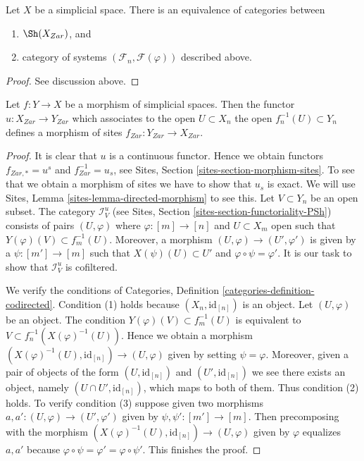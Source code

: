 \begin{lemma}
\label{lemma-describe-sheaves-simplicial-site}
Let $X$ be a simplicial space. There is an equivalence of
categories between
\begin{enumerate}
\item $\Sh(X_{Zar})$, and
\item category of systems $(\mathcal{F}_n, \mathcal{F}(\varphi))$
described above.
\end{enumerate}
\end{lemma}

\begin{proof}
See discussion above.
\end{proof}

\begin{lemma}
\label{lemma-simplicial-space-site-functorial}
Let $f : Y \to X$ be a morphism of simplicial spaces.
Then the functor $u : X_{Zar} \to Y_{Zar}$
which associates to the open $U \subset X_n$ the open
$f_n^{-1}(U) \subset Y_n$ defines a morphism of sites
$f_{Zar} : Y_{Zar} \to X_{Zar}$.
\end{lemma}

\begin{proof}
It is clear that $u$ is a continuous functor. Hence we obtain functors
$f_{Zar, *} = u^s$ and $f_{Zar}^{-1} = u_s$, see
Sites, Section \ref{sites-section-morphism-sites}.
To see that we obtain a morphism of sites we have to show
that $u_s$ is exact. We will use
Sites, Lemma \ref{sites-lemma-directed-morphism} to see this.
Let $V \subset Y_n$ be an open subset. The category
$\mathcal{I}_V^u$ (see Sites, Section \ref{sites-section-functoriality-PSh})
consists of pairs $(U, \varphi)$ where
$\varphi : [m] \to [n]$ and $U \subset X_m$ open such that
$Y(\varphi)(V) \subset f_m^{-1}(U)$. Moreover, a morphism
$(U, \varphi) \to (U', \varphi')$ is given by a
$\psi : [m'] \to [m]$ such that $X(\psi)(U) \subset U'$
and $\varphi \circ \psi = \varphi'$.
It is our task to show that $\mathcal{I}_V^u$ is cofiltered.

\medskip\noindent
We verify the conditions of
Categories, Definition \ref{categories-definition-codirected}.
Condition (1) holds because $(X_n, \text{id}_{[n]})$ is an object.
Let $(U, \varphi)$ be an object. The condition
$Y(\varphi)(V) \subset f_m^{-1}(U)$ is equivalent to
$V \subset f_n^{-1}(X(\varphi)^{-1}(U))$. Hence we obtain a morphism
$(X(\varphi)^{-1}(U), \text{id}_{[n]}) \to (U, \varphi)$ given
by setting $\psi = \varphi$. Moreover, given a pair of objects
of the form $(U, \text{id}_{[n]})$ and $(U', \text{id}_{[n]})$
we see there exists an object, namely $(U \cap U', \text{id}_{[n]})$,
which maps to both of them. Thus condition (2) holds.
To verify condition (3) suppose given two morphisms
$a, a': (U, \varphi) \to (U', \varphi')$ given by $\psi, \psi' : [m'] \to [m]$.
Then precomposing with the morphism
$(X(\varphi)^{-1}(U), \text{id}_{[n]}) \to (U, \varphi)$ given
by $\varphi$ equalizes $a, a'$ because
$\varphi \circ \psi = \varphi' = \varphi \circ \psi'$.
This finishes the proof.
\end{proof}

